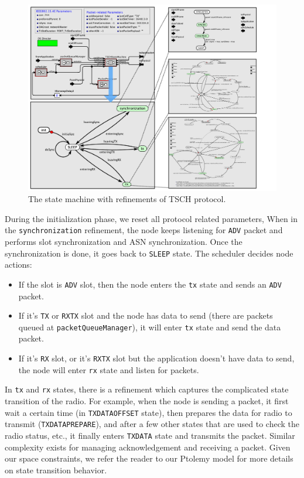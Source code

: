 \begin{figure}[t]
\centering
\includegraphics[width=1\columnwidth]{figures/PaperTSCHStateMachine}
\caption{The state machine with refinements of TSCH protocol.}
\label{fig:TSCHSM}
\end{figure}

During the initialization phase, we reset all protocol related parameters, When in the \texttt{synchronization} refinement, the node keeps listening for \texttt{ADV} packet and performs slot synchronization and ASN synchronization. Once the synchronization is done, it goes back to \texttt{SLEEP} state.
The scheduler decides node actions: 
\begin{itemize}
\item If the slot is \texttt{ADV} slot, then the node enters the \texttt{tx} state and sends an \texttt{ADV} packet. 
\item If it's \texttt{TX} or \texttt{RXTX} slot and the node has data to send (there are packets queued at \texttt{packetQueueManager}), it will enter \texttt{tx} state and send the data packet. 
\item If it's \texttt{RX} slot, or it's \texttt{RXTX} slot but the application doesn't have data to send, the node will enter \texttt{rx} state and listen for packets.
\end{itemize}

In \texttt{tx} and \texttt{rx} states, there is a refinement which captures the complicated state transition of the radio. For example, when the node is sending a packet, it first wait a certain time (in \texttt{TXDATAOFFSET} state), then prepares the data for radio to transmit (\texttt{TXDATAPREPARE}), and after a few other states that are used to check the radio status, etc., it finally enters \texttt{TXDATA} state and transmits the packet. Similar complexity exists for managing acknowledgement and receiving a packet. Given our space constraints, we refer the reader to our Ptolemy model for more details on state transition behavior.

